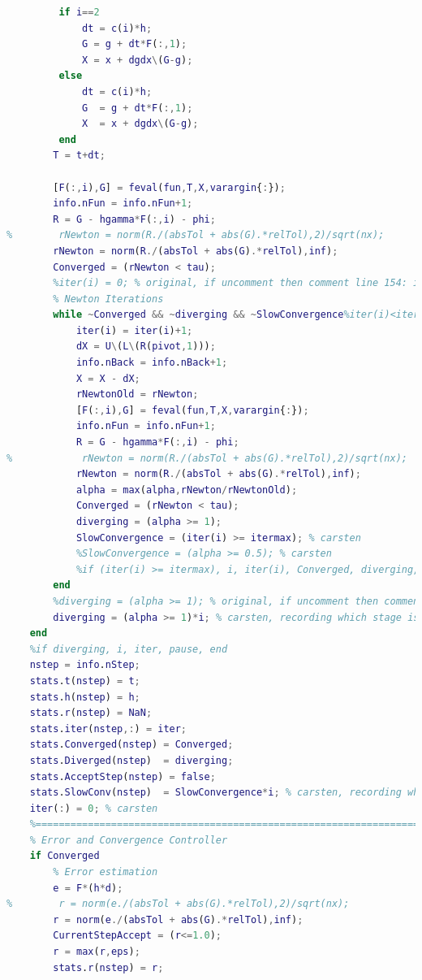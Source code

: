 \begin{lstlisting}[language=Matlab,caption=Implementation of ESDIRK23 with adaptive time step,label=lst7:esdirk]
        % Initial guess for the state
         if i==2
             dt = c(i)*h;
             G = g + dt*F(:,1);
             X = x + dgdx\(G-g);
         else
             dt = c(i)*h;
             G  = g + dt*F(:,1);
             X  = x + dgdx\(G-g);
         end
        T = t+dt;
            
        [F(:,i),G] = feval(fun,T,X,varargin{:});
        info.nFun = info.nFun+1;
        R = G - hgamma*F(:,i) - phi;
%        rNewton = norm(R./(absTol + abs(G).*relTol),2)/sqrt(nx);
        rNewton = norm(R./(absTol + abs(G).*relTol),inf);
        Converged = (rNewton < tau);
        %iter(i) = 0; % original, if uncomment then comment line 154: iter(:) = 0;
        % Newton Iterations
        while ~Converged && ~diverging && ~SlowConvergence%iter(i)<itermax
            iter(i) = iter(i)+1;
            dX = U\(L\(R(pivot,1)));
            info.nBack = info.nBack+1;
            X = X - dX;
            rNewtonOld = rNewton;
            [F(:,i),G] = feval(fun,T,X,varargin{:});
            info.nFun = info.nFun+1;
            R = G - hgamma*F(:,i) - phi;
%            rNewton = norm(R./(absTol + abs(G).*relTol),2)/sqrt(nx);
            rNewton = norm(R./(absTol + abs(G).*relTol),inf);
            alpha = max(alpha,rNewton/rNewtonOld);
            Converged = (rNewton < tau);
            diverging = (alpha >= 1);
            SlowConvergence = (iter(i) >= itermax); % carsten
            %SlowConvergence = (alpha >= 0.5); % carsten
            %if (iter(i) >= itermax), i, iter(i), Converged, diverging, pause, end % carsten
        end
        %diverging = (alpha >= 1); % original, if uncomment then comment line 142: diverging = (alpha >= 1)*i;
        diverging = (alpha >= 1)*i; % carsten, recording which stage is diverging
    end
    %if diverging, i, iter, pause, end
    nstep = info.nStep;
    stats.t(nstep) = t;
    stats.h(nstep) = h;
    stats.r(nstep) = NaN;
    stats.iter(nstep,:) = iter;
    stats.Converged(nstep) = Converged;
    stats.Diverged(nstep)  = diverging;
    stats.AcceptStep(nstep) = false;
    stats.SlowConv(nstep)  = SlowConvergence*i; % carsten, recording which stage is converging to slow (reaching maximum no. of iterations)
    iter(:) = 0; % carsten
    %=====================================================================
    % Error and Convergence Controller
    if Converged
        % Error estimation
        e = F*(h*d);
%        r = norm(e./(absTol + abs(G).*relTol),2)/sqrt(nx);
        r = norm(e./(absTol + abs(G).*relTol),inf);
        CurrentStepAccept = (r<=1.0);
        r = max(r,eps);
        stats.r(nstep) = r;

\end{lstlisting}
